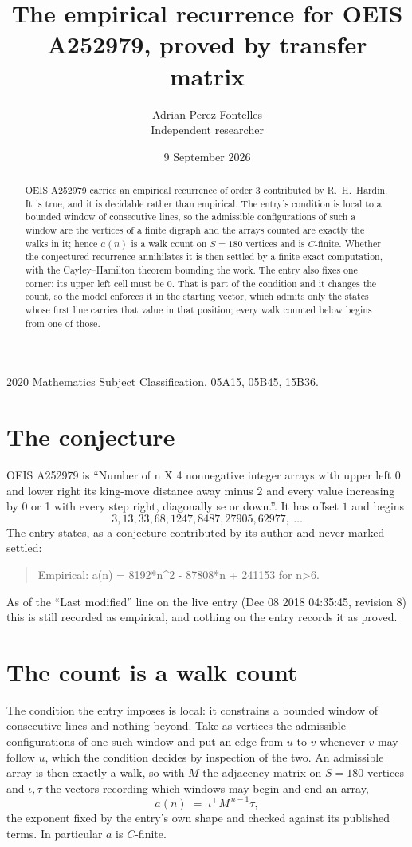 \documentclass[11pt,a4paper]{article}
\title{The empirical recurrence for OEIS A252979, proved by transfer matrix}
\author{Adrian Perez Fontelles\\ \small Independent researcher}
\date{9 September 2026}
\theoremstyle{plain}
\theoremstyle{definition}
\begin{document}
\maketitle

\begin{abstract}
OEIS A252979 carries an empirical recurrence of order $3$ contributed by R.~H.~Hardin. It is
true, and it is decidable rather than empirical. The entry's condition is local to a bounded window of consecutive lines, so
the admissible configurations of such a window are the vertices of a finite digraph and the
arrays counted are exactly the walks in it; hence $a(n)$ is a walk count on $S=180$ vertices
and is $C$-finite. Whether the conjectured recurrence annihilates it is then settled by a
finite exact computation, with the Cayley--Hamilton theorem bounding the work.
 The entry also fixes one corner: its upper left cell must be $0$. That is part of the condition and it changes the count, so the model enforces it in the starting vector, which admits only the states whose first line carries that value in that position; every walk counted below begins from one of those.\end{abstract}

\noindent\small 2020 Mathematics Subject Classification. 05A15, 05B45, 15B36.\normalsize

\section{The conjecture}

OEIS A252979 is ``Number of n X 4 nonnegative integer arrays with upper left 0 and lower right its king-move distance away minus 2 and every value increasing by 0 or 1 with every step right, diagonally se or down.''. It has offset $1$ and begins
\[
3, 13, 33, 68, 1247, 8487, 27905, 62977,\ \dots
\]
The entry states, as a conjecture contributed by its author and never marked settled:
\begin{quote}
Empirical: a(n) = 8192*n\^{}2 - 87808*n + 241153 for n>6.
\end{quote}
As of the ``Last modified'' line on the live entry (Dec 08 2018 04:35:45, revision 8) this is still
recorded as empirical, and nothing on the entry records it as proved.

\section{The count is a walk count}

The condition the entry imposes is local: it constrains a bounded window of consecutive lines and nothing beyond. Take as
vertices the admissible configurations of one such window and put an edge from $u$ to $v$
whenever $v$ may follow $u$, which the condition decides by inspection of the two. An
admissible array is then exactly a walk, so with $M$ the adjacency matrix on $S=180$ vertices
and $\iota,\tau$ the vectors recording which windows may begin and end an array,
\[
a(n)\;=\;\iota^{\!\top}M^{\,n-1}\tau ,
\]
the exponent fixed by the entry's own shape and checked against its published terms. In
particular $a$ is $C$-finite.
\end{document}
